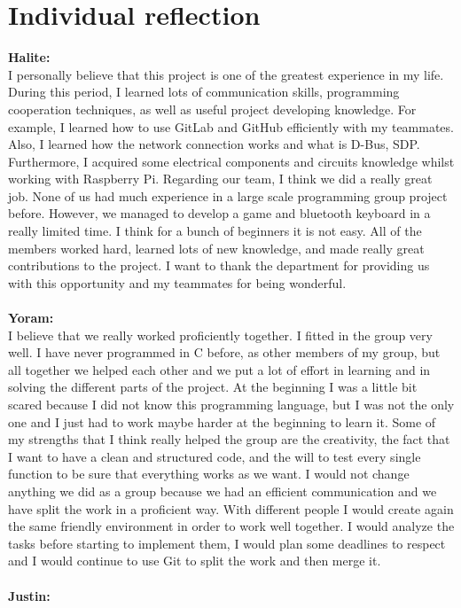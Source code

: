 \documentclass[a4paper]{article}
\begin{document}
\section{Individual reflection}
\textbf{Halite:}\\
I personally believe that this project is one of the greatest experience in my life. During this period, I learned lots of communication skills, programming cooperation techniques, as well as useful project developing knowledge. For example, I learned how to use GitLab and GitHub efficiently with my teammates. Also, I learned how the network connection works and what is D-Bus, SDP. Furthermore, I acquired some electrical components and circuits knowledge whilst working with Raspberry Pi. Regarding our team, I think we did a really great job. None of us had much experience in a large scale programming group project before. However, we managed to develop a game and bluetooth keyboard in a really limited time. I think for a bunch of beginners it is not easy. All of the members worked hard, learned lots of new knowledge, and made really great contributions to the project. I want to thank the department for providing us with this opportunity and my teammates for being wonderful.
\\\\
\textbf{Yoram:}\\
I believe that we really worked proficiently together. I fitted in the group very well. I have never programmed in C before, as other members of my group, but all together we helped each other and we put a lot of effort in learning and in solving the different parts of the project. At the beginning I was a little bit scared because I did not know this programming language, but I was not the only one and I just had to work maybe harder at the beginning to learn it. Some of my strengths that I think really helped the group are the creativity, the fact that I want to have a clean and structured code, and the will to test every single function to be sure that everything works as we want.
I would not change anything we did as a group because we had an efficient communication and we have split the work in a proficient way. With different people I would create again the same friendly environment in order to work well together. I would analyze the tasks before starting to implement them, I would plan some deadlines to respect and I would continue to use Git to split the work and then merge it. 
\\\\
\textbf{Justin:}\\
\end{document}
